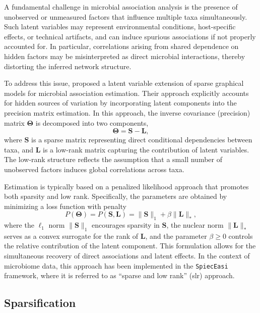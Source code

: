 A fundamental challenge in microbial association analysis is the presence of unobserved or unmeasured factors that influence multiple taxa simultaneously. Such latent variables may represent environmental conditions, host-specific effects, or technical artifacts, and can induce spurious associations if not properly accounted for. In particular, correlations arising from shared dependence on hidden factors may be misinterpreted as direct microbial interactions, thereby distorting the inferred network structure.

To address this issue, \citet{kurtz2019disentangling} proposed a latent variable extension of sparse graphical models for microbial association estimation. Their approach explicitly accounts for hidden sources of variation by incorporating latent components into the precision matrix estimation. In this approach, the inverse covariance (precision) matrix $\boldsymbol{\Theta}$ is decomposed into two components,
\begin{equation}
\boldsymbol{\Theta} = \mathbf{S} - \mathbf{L},
\end{equation}
where $\mathbf{S}$ is a sparse matrix representing direct conditional dependencies between taxa, and $\mathbf{L}$ is a low-rank matrix capturing the contribution of latent variables. The low-rank structure reflects the assumption that a small number of unobserved factors induces global correlations across taxa.

Estimation is typically based on a penalized likelihood approach that promotes both sparsity and low rank. Specifically, the parameters are obtained by minimizing a loss function with penalty
\begin{equation}
P(\boldsymbol{\Theta}) = P(\mathbf{S},\mathbf{L}) = \|\mathbf{S}\|_1 + \beta \|\mathbf{L}\|_*,
\end{equation}
where the $\ell_1$ norm $\|\mathbf{S}\|_1$ encourages sparsity in $\mathbf{S}$, the nuclear norm $\|\mathbf{L}\|_*$ serves as a convex surrogate for the rank of $\mathbf{L}$, and the parameter $\beta \geq 0$ controls the relative contribution of the latent component. This formulation allows for the simultaneous recovery of direct associations and latent effects.
In the context of microbiome data, this approach has been implemented in the \texttt{SpiecEasi} framework, where it is referred to as ``sparse and low rank'' (slr) approach.

\subsection{Sparsification}
\label{sec:5net:net_constr:sparsification}

